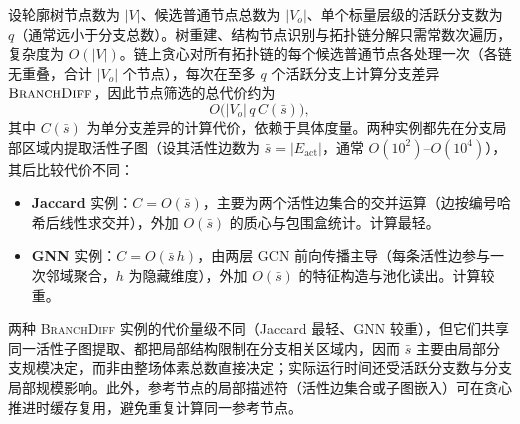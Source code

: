 \documentclass[twocolumn, a4paper, 10pt]{article}
\begin{document}
设轮廓树节点数为 $|V|$、候选普通节点总数为 $|V_o|$、单个标量层级的活跃分支数为 $q$（通常远小于分支总数）。树重建、结构节点识别与拓扑链分解只需常数次遍历，复杂度为 $O(|V|)$。链上贪心对所有拓扑链的每个候选普通节点各处理一次（各链无重叠，合计 $|V_o|$ 个节点），每次在至多 $q$ 个活跃分支上计算分支差异 $\textsc{BranchDiff}$，因此节点筛选的总代价约为
\begin{equation}
O\bigl(|V_o|\,q\,C(\bar{s})\bigr),
\end{equation}
其中 $C(\bar{s})$ 为单分支差异的计算代价，依赖于具体度量。两种实例都先在分支局部区域内提取活性子图（设其活性边数为 $\bar{s}=|E_{\mathrm{act}}|$，通常 $O(10^2)$–$O(10^4)$），其后比较代价不同：
\begin{itemize}
\item \textbf{Jaccard} 实例：$C=O(\bar{s})$，主要为两个活性边集合的交并运算（边按编号哈希后线性求交并），外加 $O(\bar{s})$ 的质心与包围盒统计。计算最轻。
\item \textbf{GNN} 实例：$C=O(\bar{s}\,h)$，由两层 GCN 前向传播主导（每条活性边参与一次邻域聚合，$h$ 为隐藏维度），外加 $O(\bar{s})$ 的特征构造与池化读出。计算较重。
\end{itemize}
两种 \textsc{BranchDiff} 实例的代价量级不同（Jaccard 最轻、GNN 较重），但它们共享同一活性子图提取、都把局部结构限制在分支相关区域内，因而 $\bar{s}$ 主要由局部分支规模决定，而非由整场体素总数直接决定；实际运行时间还受活跃分支数与分支局部规模影响。此外，参考节点的局部描述符（活性边集合或子图嵌入）可在贪心推进时缓存复用，避免重复计算同一参考节点。
\end{document}
